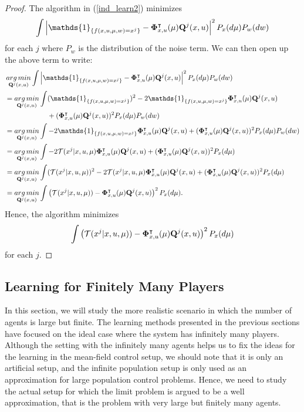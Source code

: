 \documentclass[twoside,11pt]{article}
\def\argmin{\mathop{\rm arg\, min}}
\begin{document}
\begin{proof}
The algorithm in (\ref{ind_learn2}) minimizes 
\begin{align*}
 \int \left|\mathds{1}_{\{f(x,u,\mu,w) =x^j  \}}- {\bf \Phi}_{x,u}^\intercal(\mu)   {\bf Q}^j ({x,u})  \right|^2 P_{x}(d\mu)P_w(dw)
\end{align*}
for each $j$ where $P_w$ is the distribution of the noise term. We can then open up the above term to write:
\begin{align*}
     &\argmin_{{\bf Q}^j(x,u)}\int \left|\mathds{1}_{\{f(x,u,\mu,w) =x^j  \}}- {\bf \Phi}_{x,u}^\intercal(\mu)   {\bf Q}^j({x,u}) \right|^2 P_{x}(d\mu)P_w(dw)\\
       &=\argmin_{{\bf Q}^j(x,u)}\int (\mathds{1}_{\{f(x,u,\mu,w) =x^j  \}})^2 - 2\mathds{1}_{\{f(x,u,\mu,w) =x^j  \}} {\bf \Phi}_{x,u}^\intercal(\mu)   {\bf Q}^j({x,u})  \\
       &\qquad\qquad \qquad + ({\bf \Phi}_{x,u}^\intercal(\mu)   {\bf Q}^j({x,u}) )^2 P_{x}(d\mu)P_w(dw)\\
       &=\argmin_{{\bf Q}^j(x,u)}\int  - 2\mathds{1}_{\{f(x,u,\mu,w) =x^j  \}} {\bf \Phi}_{x,u}^\intercal(\mu)   {\bf Q}^j({x,u}) + ({\bf \Phi}_{x,u}^\intercal(\mu)   {\bf Q}^j({x,u}) )^2 P_{x}(d\mu)P_w(dw)\\
        &=\argmin_{{\bf Q}^j(x,u)}\int  - 2  \mathcal{T}(x^j|x,u,\mu) {\bf \Phi}_{x,u}^\intercal(\mu)   {\bf Q}^j({x,u}) + ({\bf \Phi}_{x,u}^\intercal(\mu)   {\bf Q}^j({x,u}) )^2 P_{x}(d\mu)\\
        & =\argmin_{{\bf Q}^j(x,u)}\int  (\mathcal{T}(x^j|x,u,\mu))^2   - 2  \mathcal{T}(x^j|x,u,\mu) {\bf \Phi}_{x,u}^\intercal(\mu)   {\bf Q}^j({x,u}) + ({\bf \Phi}_{x,u}^\intercal(\mu)   {\bf Q}^j({x,u}) )^2 P_{x}(d\mu)\\
        &=\argmin_{{\bf Q}^j(x,u)}\int  \left(\mathcal{T}(x^j|x,u,\mu)) -  {\bf \Phi}_{x,u}^\intercal(\mu)   {\bf Q}^j({x,u})  \right)^2P_{x}(d\mu).
\end{align*}
Hence, the algorithm minimizes 
\begin{align*}
  \int  \left(\mathcal{T}(x^j|x,u,\mu)) -  {\bf \Phi}_{x,u}^\intercal(\mu)   {\bf Q}^j({x,u})  \right)^2P_{x}(d\mu)
\end{align*}
for each $j$.
\end{proof}




\subsection{Learning for Finitely Many Players}\label{ind_learn_fin}  In this section, we will study the more realistic scenario in which the number of agents is large but finite. The learning methods presented in the previous sections have focused on the ideal case where the system has infinitely many players. Although the setting with the infinitely many agents helps us to fix the ideas for the learning in the mean-field control setup, we should note that it is only an artificial setup, and the infinite population setup is only used as an approximation for large population control problems. Hence, we need to study the  actual setup for which the limit problem is argued to be a well approximation, that is the problem with very large but finitely many agents. 
\end{document}
